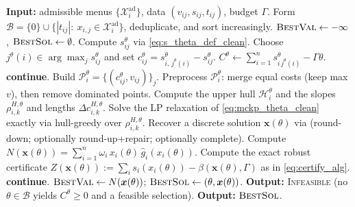 \documentclass[11pt, a4paper]{article}
\theoremstyle{plain}
\theoremstyle{definition}
\theoremstyle{remark}
\begin{document}
\begin{algorithm}[H]
\footnotesize
\caption{Robust hull-greedy with $\theta$-enumeration and discrete recovery}\label{alg:robust_hull_greedy}
\begin{algorithmic}[1]
\State \textbf{Input:} admissible menus $\{\mathcal X_i^{\mathrm{ad}}\}$, data $(v_{ij},s_{ij},t_{ij})$, budget $\Gamma$.
\State Form $\mathcal B=\{0\}\cup\{|t_{ij}|:\ x_{i,j}\in\mathcal X_i^{\mathrm{ad}}\}$, deduplicate, and sort increasingly.
\State $\textsc{BestVal}\leftarrow -\infty$, $\textsc{BestSol}\leftarrow \emptyset$.
    \State Compute $s^\theta_{ij}$ via \eqref{eq:s_theta_def_clean}.
    \State Choose $j^\theta(i)\in\arg\max_j s^\theta_{ij}$ and set $c^\theta_{ij}=s^\theta_{i,\,j^\theta(i)}-s^\theta_{ij}$.
    \State $C^\theta\leftarrow \sum_{i=1}^n s^\theta_{i\,j^\theta(i)}-\Gamma\theta$.  \textbf{continue}. \EndIf
        \State Build $\mathcal P_i^\theta=\{(c^\theta_{ij},v_{ij})\}_j$.
        \State Preprocess $\mathcal P_i^\theta$: merge equal costs (keep max $v$), then remove dominated points.
        \State Compute the upper hull $\mathcal H_i^\theta$ and the slopes $\rho^{H,\theta}_{i,k}$ and lengths $\Delta c^{H,\theta}_{i,k}$.
    \EndFor
    \State Solve the LP relaxation of \eqref{eq:mckp_theta_clean} exactly via hull-greedy over $\rho^{H,\theta}_{i,k}$.
    \State Recover a discrete solution $\bm x(\theta)$ via  (round-down; optionally round-up+repair; optionally complete).
    \State Compute $N(\bm x(\theta))=\sum_{i=1}^n \omega_i\,x_i(\theta)\,\hat g_i(x_i(\theta))$.
    \State Compute the exact robust certificate $Z(\bm x(\theta)):=\sum_i s_i(x_i(\theta))-\beta(\bm x(\theta),\Gamma)$ as in \eqref{eq:certify_alg}.
     \textbf{continue}. \EndIf
        \State $\textsc{BestVal}\leftarrow N(\bm x(\theta))$; $\textsc{BestSol}\leftarrow (\theta,\bm x(\theta))$.
    \EndIf
\EndFor
{}
    \State \textbf{Output:} \textsc{Infeasible} (no $\theta\in\mathcal B$ yields $C^\theta\ge 0$ and a feasible selection).
\Else
    \State \textbf{Output:} $\textsc{BestSol}$.
\EndIf
\end{algorithmic}
\end{algorithm}
\end{document}

